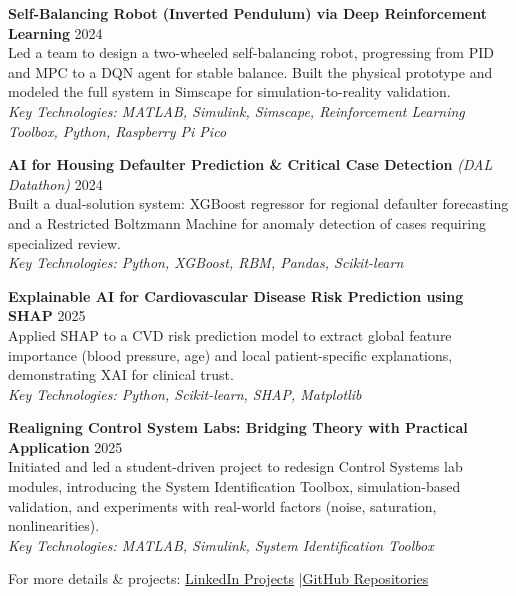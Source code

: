 \documentclass[a4paper,11pt]{article}
\begin{document}
\vspace{4pt}
\textbf{Self-Balancing Robot (Inverted Pendulum) via Deep Reinforcement Learning} \hfill 2024 \\
Led a team to design a two-wheeled self-balancing robot, progressing from PID and MPC to a DQN agent for stable balance. Built the physical prototype and modeled the full system in Simscape for simulation-to-reality validation. \\
{\small\textit{Key Technologies: MATLAB, Simulink, Simscape, Reinforcement Learning Toolbox, Python, Raspberry Pi Pico}}

\vspace{4pt}
\textbf{AI for Housing Defaulter Prediction \& Critical Case Detection} \textit{(DAL Datathon)} \hfill 2024 \\
Built a dual-solution system: XGBoost regressor for regional defaulter forecasting and a Restricted Boltzmann Machine for anomaly detection of cases requiring specialized review. \\
{\small\textit{Key Technologies: Python, XGBoost, RBM, Pandas, Scikit-learn}}

\vspace{4pt}
\textbf{Explainable AI for Cardiovascular Disease Risk Prediction using SHAP} \hfill 2025 \\
Applied SHAP to a CVD risk prediction model to extract global feature importance (blood pressure, age) and local patient-specific explanations, demonstrating XAI for clinical trust. \\
{\small\textit{Key Technologies: Python, Scikit-learn, SHAP, Matplotlib}}

\vspace{4pt}
\textbf{Realigning Control System Labs: Bridging Theory with Practical Application} \hfill 2025 \\
Initiated and led a student-driven project to redesign Control Systems lab modules, introducing the System Identification Toolbox, simulation-based validation, and experiments with real-world factors (noise, saturation, nonlinearities). \\
{\small\textit{Key Technologies: MATLAB, Simulink, System Identification Toolbox}}

\vspace{4pt}
\noindent For more details \& projects: \href{https://www.linkedin.com/in/mah-sam/details/projects/}{LinkedIn Projects} \quad|\quad \href{https://github.com/mah-sam?tab=repositories}{GitHub Repositories}
\end{document}

